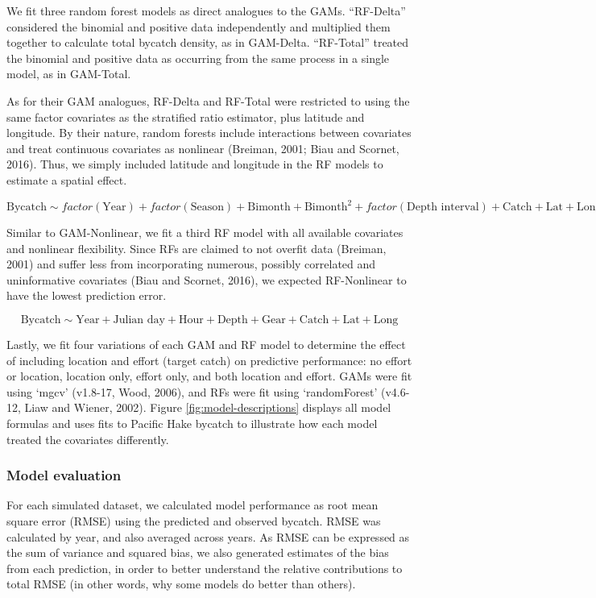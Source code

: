 \documentclass[]{article}
\begin{document}
We fit three random forest models as direct analogues to the GAMs.
``RF-Delta'' considered the binomial and positive data independently and
multiplied them together to calculate total bycatch density, as in
GAM-Delta. ``RF-Total'' treated the binomial and positive data as
occurring from the same process in a single model, as in GAM-Total.

As for their GAM analogues, RF-Delta and RF-Total were restricted to
using the same factor covariates as the stratified ratio estimator, plus
latitude and longitude. By their nature, random forests include
interactions between covariates and treat continuous covariates as
nonlinear (Breiman, 2001; Biau and Scornet, 2016). Thus, we simply
included latitude and longitude in the RF models to estimate a spatial
effect.

\[ \text{Bycatch} \sim factor(\text{Year}) + factor(\text{Season}) + \text{Bimonth} + \text{Bimonth}^2 + factor(\text{Depth interval}) + \text{Catch} + \text{Lat} + \text{Long} \]

Similar to GAM-Nonlinear, we fit a third RF model with all available
covariates and nonlinear flexibility. Since RFs are claimed to not
overfit data (Breiman, 2001) and suffer less from incorporating
numerous, possibly correlated and uninformative covariates (Biau and
Scornet, 2016), we expected RF-Nonlinear to have the lowest prediction
error.

\[ \text{Bycatch} \sim \text{Year} + \text{Julian day} + \text{Hour} + \text{Depth} + \text{Gear} + \text{Catch} + \text{Lat} + \text{Long} \]

Lastly, we fit four variations of each GAM and RF model to determine the
effect of including location and effort (target catch) on predictive
performance: no effort or location, location only, effort only, and both
location and effort. GAMs were fit using `mgcv' (v1.8-17, Wood, 2006),
and RFs were fit using `randomForest' (v4.6-12, Liaw and Wiener, 2002).
Figure \ref{fig:model-descriptions} displays all model formulas and uses
fits to Pacific Hake bycatch to illustrate how each model treated the
covariates differently.

\subsubsection{Model evaluation}\label{model-evaluation}

For each simulated dataset, we calculated model performance as root mean
square error (RMSE) using the predicted and observed bycatch. RMSE was
calculated by year, and also averaged across years. As RMSE can be
expressed as the sum of variance and squared bias, we also generated
estimates of the bias from each prediction, in order to better
understand the relative contributions to total RMSE (in other words, why
some models do better than others).
\end{document}
